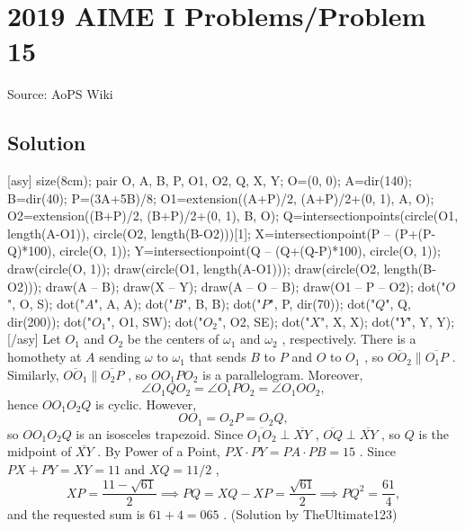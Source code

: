 \documentclass[12pt]{article}
\begin{document}
\section*{{2019 AIME I Problems/Problem 15}}
Source: AoPS Wiki

\subsection*{Solution}
[asy] size(8cm); pair O, A, B, P, O1, O2, Q, X, Y; O=(0, 0); A=dir(140); B=dir(40); P=(3A+5B)/8; O1=extension((A+P)/2, (A+P)/2+(0, 1), A, O); O2=extension((B+P)/2, (B+P)/2+(0, 1), B, O); Q=intersectionpoints(circle(O1, length(A-O1)), circle(O2, length(B-O2)))[1]; X=intersectionpoint(P -- (P+(P-Q)*100), circle(O, 1)); Y=intersectionpoint(Q -- (Q+(Q-P)*100), circle(O, 1)); draw(circle(O, 1)); draw(circle(O1, length(A-O1))); draw(circle(O2, length(B-O2))); draw(A -- B); draw(X -- Y); draw(A -- O -- B); draw(O1 -- P -- O2); dot("$O$", O, S); dot("$A$", A, A); dot("$B$", B, B); dot("$P$", P, dir(70)); dot("$Q$", Q, dir(200)); dot("$O_1$", O1, SW); dot("$O_2$", O2, SE); dot("$X$", X, X); dot("$Y$", Y, Y); [/asy] Let $O_1$ and $O_2$ be the centers of $\omega_1$ and $\omega_2$ , respectively. There is a homothety at $A$ sending $\omega$ to $\omega_1$ that sends $B$ to $P$ and $O$ to $O_1$ , so $\overline{OO_2}\parallel\overline{O_1P}$ . Similarly, $\overline{OO_1}\parallel\overline{O_2P}$ , so $OO_1PO_2$ is a parallelogram. Moreover, \[\angle O_1QO_2=\angle O_1PO_2=\angle O_1OO_2,\] hence $OO_1O_2Q$ is cyclic. However, \[OO_1=O_2P=O_2Q,\] so $OO_1O_2Q$ is an isosceles trapezoid. Since $\overline{O_1O_2}\perp\overline{XY}$ , $\overline{OQ}\perp\overline{XY}$ , so $Q$ is the midpoint of $\overline{XY}$ . By Power of a Point, $PX\cdot PY=PA\cdot PB=15$ . Since $PX+PY=XY=11$ and $XQ=11/2$ , \[XP=\frac{11-\sqrt{61}}2\implies PQ=XQ-XP=\frac{\sqrt{61}}2\implies PQ^2=\frac{61}4,\] and the requested sum is $61+4=\boxed{065}$ . (Solution by TheUltimate123)
\end{document}
